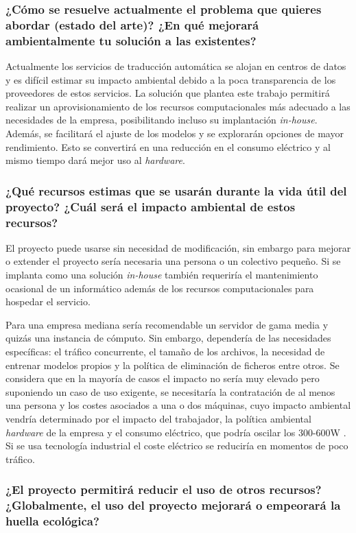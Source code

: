 \subsubsection{¿Cómo se resuelve actualmente el problema que quieres abordar (estado del arte)?
¿En qué mejorará ambientalmente tu solución a las existentes?}

Actualmente los servicios de traducción automática se alojan en centros de datos y
es difícil estimar su impacto ambiental debido a la poca transparencia de los proveedores
de estos servicios. La solución que plantea este trabajo permitirá realizar un aprovisionamiento
de los recursos computacionales más adecuado a las necesidades de la empresa, posibilitando incluso
su implantación \textit{in-house}. Además, se facilitará el ajuste de los modelos y se
explorarán opciones de mayor rendimiento.
Esto se convertirá en una reducción en el consumo eléctrico y al mismo tiempo dará mejor uso al
\textit{hardware}.

\subsubsection{¿Qué recursos estimas que se usarán durante la vida útil del proyecto? ¿Cuál será el impacto ambiental de estos recursos?}

El proyecto puede usarse sin necesidad de modificación, sin embargo para mejorar o extender el proyecto sería necesaria una persona o un colectivo pequeño. Si se implanta como una solución \textit{in-house} también requeriría el mantenimiento ocasional de un informático además de los recursos computacionales para hospedar el servicio.

Para una empresa mediana sería recomendable un servidor de gama media y quizás una instancia de cómputo. Sin embargo, dependería de las necesidades específicas: el tráfico concurrente, el tamaño de los archivos, la necesidad de entrenar modelos propios y la política de eliminación de ficheros entre otros. Se considera que en la mayoría de casos el impacto no sería muy elevado pero suponiendo un caso de uso exigente, se necesitaría la contratación de al menos una persona y los costes asociados a una o dos máquinas, cuyo impacto ambiental vendría determinado por el impacto del trabajador, la política ambiental \textit{hardware} de la empresa y el consumo eléctrico, que podría oscilar los 300-600W \cite{Davy2022Jan}. Si se usa tecnología industrial el coste eléctrico se reduciría en momentos de poco tráfico.

\subsubsection{¿El proyecto permitirá reducir el uso de otros recursos? ¿Globalmente, el uso del proyecto mejorará o empeorará la huella ecológica?}

